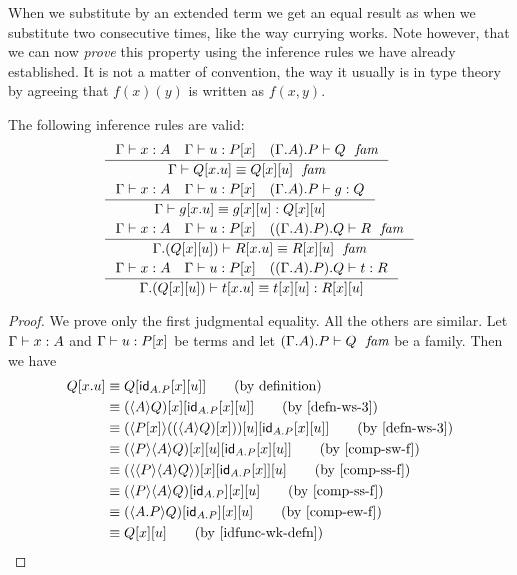 When we substitute by an extended term we get an equal result as when we
substitute two consecutive times, like the way currying works. Note however,
that we can now \emph{prove} this property using the inference rules we have
already established. It is not a matter of convention, the way it usually is
in type theory by agreeing that $f(x)(y)$ is written as $f(x,y)$. 

\begin{lem}
The following inference rules are valid:
\begin{align*}
& \inference{\jterm{\Gamma}{A}{x}\quad\jterm{\Gamma}{\subst{x}{P}}{u}\quad\jfam{\ctxext{{\Gamma}{A}}{P}}{Q}}
  {\jfameq{\Gamma}{\subst{\ctxext{x}{u}}{Q}}{\subst{u}{{x}{Q}}}}\\
& \inference{\jterm{\Gamma}{A}{x}\quad\jterm{\Gamma}{\subst{x}{P}}{u}\quad\jterm{\ctxext{{\Gamma}{A}}{P}}{Q}{g}}
  {\jtermeq{\Gamma}{\subst{u}{{x}{Q}}}{\subst{\ctxext{x}{u}}{g}}{\subst{u}{{x}{g}}}}\\
& \inference{\jterm{\Gamma}{A}{x}\quad\jterm{\Gamma}{\subst{x}{P}}{u}\quad\jfam{\ctxext{{{\Gamma}{A}}{P}}{Q}}{R}}
  {\jfameq{\ctxext{\Gamma}{\subst{u}{{x}{Q}}}}{\subst{\ctxext{x}{u}}{R}}{\subst{u}{{x}{R}}}}\\
& \inference{\jterm{\Gamma}{A}{x}\quad\jterm{\Gamma}{\subst{x}{P}}{u}\quad\jterm{\ctxext{{{\Gamma}{A}}{P}}{Q}}{R}{t}}
  {\jtermeq{\ctxext{\Gamma}{\subst{u}{{x}{Q}}}}{\subst{u}{{x}{R}}}{\subst{\ctxext{x}{u}}{t}}{\subst{u}{{x}{t}}}}
\end{align*}
\end{lem}

\begin{proof}
We prove only the first judgmental equality. All the others are similar.
Let $\jterm{\Gamma}{A}{x}$ and $\jterm{\Gamma}{\subst{x}{P}}{u}$
be terms and let $\jfam{\ctxext{{\Gamma}{A}}{P}}{Q}$ be a family. Then we have
\begin{align*}
\subst{\ctxext{x}{u}}{Q} 
& \jdeq \subst{{u}{{x}{\idfunc[\ctxext{A}{P}]}}}{Q} \tag{by definition}\\
& \jdeq \subst{{u}{{x}{\idfunc[\ctxext{A}{P}]}}}{{x}{\ctxwk{A}{Q}}}\tag{by \autoref{defn-ws-3}}\\
& \jdeq \subst{{u}{{x}{\idfunc[\ctxext{A}{P}]}}}{{u}{\ctxwk{\subst{x}{P}}{\subst{x}{\ctxwk{A}{Q}}}}}\tag{by \autoref{defn-ws-3}}\\
& \jdeq \subst{{u}{{x}{\idfunc[\ctxext{A}{P}]}}}{{u}{{x}{\ctxwk{P}{{A}{Q}}}}}\tag{by \autoref{comp-sw-f}}\\
& \jdeq \subst{u}{{{x}{\idfunc[\ctxext{A}{P}]}}{{x}{\ctxwk{{P}{{A}{Q}}}}}}\tag{by \autoref{comp-ss-f}}\\
& \jdeq \subst{u}{{x}{{\idfunc[\ctxext{A}{P}]}{\ctxwk{P}{{A}{Q}}}}}\tag{by \autoref{comp-ss-f}}\\
& \jdeq \subst{u}{{x}{{\idfunc[\ctxext{A}{P}]}{\ctxwk{\ctxext{A}{P}}{Q}}}}\tag{by \autoref{comp-ew-f}}\\
& \jdeq \subst{u}{{x}{Q}}\tag{by \autoref{idfunc-wk-defn}}
\end{align*}
\end{proof}

